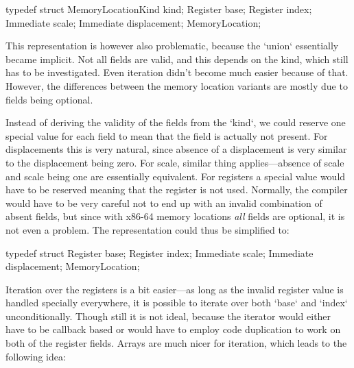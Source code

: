 \begtt
typedef struct {
	MemoryLocationKind kind;
	Register base;
	Register index;
	Immediate scale;
	Immediate displacement;
} MemoryLocation;
\endtt

This representation is however also problematic, because the `union` essentially
became implicit. Not all fields are valid, and this depends on the kind, which
still has to be investigated. Even iteration didn't become much easier because
of that. However, the differences between the memory location variants are
mostly due to fields being optional.

Instead of deriving the validity of the fields from the `kind`, we could reserve
one special value for each field to mean that the field is actually not present.
For displacements this is very natural, since absence of a displacement is very
similar to the displacement being zero. For scale, similar thing applies---absence of
scale and scale being one are essentially equivalent. For registers a special value would
have to be reserved meaning that the register is not used. Normally, the
compiler would have to be very careful not to end up with an invalid combination
of absent fields, but since with x86-64 memory locations {\em all} fields are
optional, it is not even a problem. The representation could thus be simplified
to:

\begtt
typedef struct {
	Register base;
	Register index;
	Immediate scale;
	Immediate displacement;
} MemoryLocation;
\endtt

Iteration over the registers is a bit easier---as long as the invalid register
value is handled specially everywhere, it is possible to iterate over both
`base` and `index` unconditionally. Though still it is not ideal, because the
iterator would either have to be callback based or would have to employ code
duplication to work on both of the register fields. Arrays are much nicer for
iteration, which leads to the following idea:


